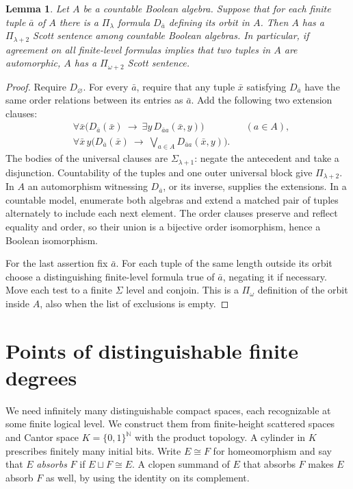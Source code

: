 \documentclass[11pt,letterpaper]{article}
\newtheorem{lemma}[theorem]{Lemma}
\theoremstyle{definition}\newtheorem{definition}[theorem]{Definition}
\newcommand{\N}{\mathbb N}
\begin{document}
\begin{lemma}\label{lem:orbits}
Let \(A\) be a countable Boolean algebra. Suppose that for each finite
tuple \(\bar a\) of \(A\) there is a \(\Pi_\lambda\) formula \(D_{\bar a}\)
defining its orbit \emph{in \(A\)}. Then \(A\) has a \(\Pi_{\lambda+2}\)
Scott sentence among countable Boolean algebras. In particular, if agreement
on all finite-level formulas implies that two tuples in \(A\) are
automorphic, \(A\) has a \(\Pi_{\omega+2}\) Scott sentence.
\end{lemma}
\begin{proof}
Require \(D_\varnothing\). For every \(\bar a\), require that any tuple
\(\bar x\) satisfying \(D_{\bar a}\) have the same order relations between
its entries as \(\bar a\). Add the following two extension clauses:
\[
\begin{aligned}
 &\forall\bar x\bigl(D_{\bar a}(\bar x)\ \longrightarrow\
        \exists y\,D_{\bar a a}(\bar x,y)\bigr) &&(a\in A),\\
 &\forall\bar x\,y\bigl(D_{\bar a}(\bar x)\ \longrightarrow\
        \bigvee_{a\in A} D_{\bar a a}(\bar x,y)\bigr).
\end{aligned}
\]
The bodies of the universal clauses are \(\Sigma_{\lambda+1}\):
negate the antecedent and take a disjunction. Countability of the tuples
and one outer universal block give \(\Pi_{\lambda+2}\). In \(A\) an
automorphism witnessing \(D_{\bar a}\), or its inverse, supplies the
extensions. In a countable model, enumerate both algebras and extend a
matched pair of tuples alternately to include each next element. The order
clauses preserve and reflect equality and order, so their union is a
bijective order isomorphism, hence a Boolean isomorphism.

For the last assertion fix \(\bar a\). For each tuple of the same length
outside its orbit choose a distinguishing finite-level formula true of
\(\bar a\), negating it if necessary. Move each test to a finite
\(\Sigma\) level and conjoin. This is a \(\Pi_\omega\) definition of the
orbit inside \(A\), also when the list of exclusions is empty.
\end{proof}
\section{Points of distinguishable finite degrees}\label{sec:packets}
We need infinitely many distinguishable compact spaces, each recognizable
at some finite logical level. We construct them from finite-height scattered
spaces and Cantor space \(K=\{0,1\}^{\N}\) with the product topology. A cylinder
in \(K\) prescribes finitely many initial bits. Write \(E\cong F\) for homeomorphism
and say that \(E\) \emph{absorbs} \(F\) if \(E\sqcup F\cong E\).
A clopen summand of \(E\) that absorbs \(F\) makes \(E\) absorb \(F\)
as well, by using the identity on its complement.
\end{document}
